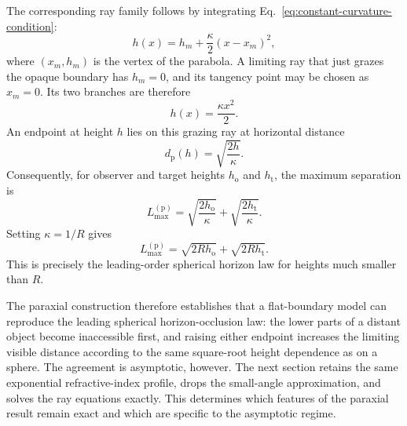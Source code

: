The corresponding ray family follows by integrating
Eq.~\eqref{eq:constant-curvature-condition}:
\begin{equation}
    h(x)=h_m+\frac{\kappa}{2}(x-x_m)^2,
    \label{eq:paraxial-ray-family}
\end{equation}
where $(x_m,h_m)$ is the vertex of the parabola. A limiting ray that just
grazes the opaque boundary has $h_m=0$, and its tangency point may be chosen
as $x_m=0$. Its two branches are therefore
\begin{equation}
    h(x)=\frac{\kappa x^2}{2}.
    \label{eq:paraxial-grazing-ray}
\end{equation}
An endpoint at height $h$ lies on this grazing ray at horizontal distance
\begin{equation}
    d_{\mathrm{p}}(h)
    =
    \sqrt{\frac{2h}{\kappa}}.
    \label{eq:paraxial-horizon-distance}
\end{equation}
Consequently, for observer and target heights $h_{\mathrm{o}}$ and
$h_{\mathrm{t}}$, the maximum separation is
\begin{equation}
    L_{\max}^{(\mathrm{p})}
    =
    \sqrt{\frac{2h_{\mathrm{o}}}{\kappa}}
    +
    \sqrt{\frac{2h_{\mathrm{t}}}{\kappa}}.
    \label{eq:paraxial-maximum-separation}
\end{equation}
Setting $\kappa=1/R$ gives
\begin{equation}
    L_{\max}^{(\mathrm{p})}
    =
    \sqrt{2Rh_{\mathrm{o}}}
    +
    \sqrt{2Rh_{\mathrm{t}}}.
    \label{eq:paraxial-spherical-law}
\end{equation}
This is precisely the leading-order spherical horizon law for heights much
smaller than $R$.

The paraxial construction therefore establishes that a flat-boundary model
can reproduce the leading spherical horizon-occlusion law: the lower
parts of a distant object become inaccessible first, and raising either
endpoint increases the limiting visible distance according to the same
square-root height dependence as on a sphere. The agreement is asymptotic,
however. The next section retains the same exponential refractive-index
profile, drops the small-angle approximation, and solves the ray equations
exactly. This determines which features of the paraxial result remain exact
and which are specific to the asymptotic regime.
